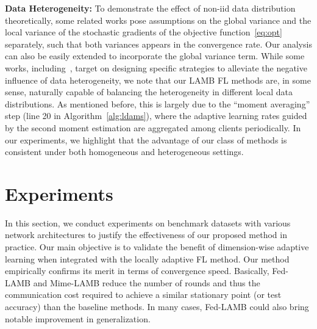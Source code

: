 \documentclass[nohyperref]{article}
\theoremstyle{plain}
\theoremstyle{definition}
\theoremstyle{remark}
\begin{document}
\noindent\textbf{Data Heterogeneity:} To demonstrate the effect of non-iid data distribution theoretically, some related works pose assumptions on the global variance and the local variance of the stochastic gradients of the objective function~\eqref{eq:opt} separately, such that both variances appears in the convergence rate. 
Our analysis can also be easily extended to incorporate the global variance term. 
While some works, including~\citet{karimireddy2019scaffold}, target on designing specific strategies to alleviate the negative influence of data heterogeneity, we note that our LAMB FL methods are, in some sense, naturally capable of balancing the heterogeneity in different local data distributions. 
As mentioned before, this is largely due to the ``moment averaging'' step (line 20 in Algorithm~\ref{alg:ldams}), where the adaptive learning rates guided by the second moment estimation are aggregated among clients periodically. 
In our experiments, we highlight that the advantage of our class of methods is consistent under both homogeneous and heterogeneous settings. 





\section{Experiments}\label{sec:numerical}

In this section, we conduct experiments on benchmark datasets with various network architectures to justify the effectiveness of our proposed method in practice. Our main objective is to validate the benefit of dimension-wise adaptive learning when integrated with the locally adaptive FL method.
Our method empirically confirms its merit in terms of convergence speed.
Basically, Fed-LAMB and Mime-LAMB reduce the number of rounds and thus the communication cost required to achieve a similar stationary point (or test accuracy) than the baseline methods. In many cases, Fed-LAMB could also bring notable improvement in generalization.
\end{document}
